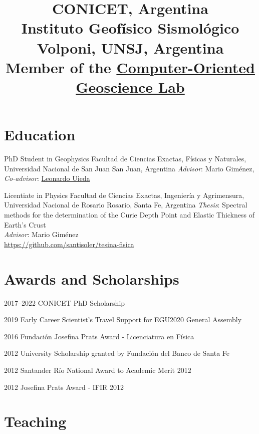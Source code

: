 \documentclass[a4paper,12pt,sans,colorlinks]{moderncv/moderncv}
\title{%
    \small
    CONICET, Argentina
    \\
    Instituto Geofísico Sismológico Volponi, UNSJ, Argentina
    \\
    Member of the
    \href{https://www.compgeolab.org}{Computer-Oriented Geoscience Lab}
}
\newcommand{\leo}{\href{https://www.leouieda.com}{Leonardo Uieda}}
\newcommand{\mario}{Mario Giménez}
\begin{document}

\maketitle


\section{Education}

{PhD Student in Geophysics}
{
    Facultad de Ciencias Exactas, Físicas y Naturales,
    Universidad Nacional de San Juan
}
{San Juan, Argentina}
{}
{\emph{Advisor}: \mario{}, \emph{Co-advisor}: \leo{}}

{Licentiate in Physics}
{
    Facultad de Ciencias Exactas, Ingeniería y Agrimensura,
    Universidad Nacional de Rosario
}
{Rosario, Santa Fe, Argentina}
{}
{
    \emph{Thesis}: Spectral methods for the determination of the Curie Depth
    Point and Elastic Thickness of Earth's Crust
    \\
    \emph{Advisor}: \mario{}
    \\
    \url{https://github.com/santisoler/tesina-fisica}
}


\section{Awards and Scholarships}

\cvline
{2017--2022}
{CONICET PhD Scholarship}

\cvline
{2019}
{Early Career Scientist's Travel Support for EGU2020 General Assembly}

\cvline
{2016}
{Fundación Josefina Prats Award - Licenciatura en Física}

\cvline
{2012}
{University Scholarship granted by Fundación del Banco de Santa Fe}

\cvline
{2012}
{Santander Río National Award to Academic Merit 2012}

\cvline
{2012}
{Josefina Prats Award - IFIR 2012}



\section{Teaching}
\end{document}
